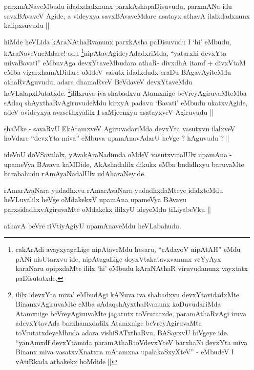 \begin{artha}
parxmANaveMbudu idadxdadxnunx parxkAshapaDisuvudu, parxmANa idu
savxBAvaveV Agide, a videyxya savxBAvaveMdare asatayx athavA
ilalxdadxnunx kalipxsuvudu ||
\end{artha}

\begin{artha}
hiMde heVLida kAraNAthaRvanunx parxkAsha paDisuvudu I `hi' eMbudu,
kAraNaveVneMdare! adu \footnote[1]{cakArAdi avayxyagaLige nipAtaveMdu
  hesaru, ``cAdayoV nipAtAH'' eMdu pANi nisUtarxvu ide, nipAtagaLige
  doyxVtakatavxvanunx veYyAyx karaNaru opipxdaMte ililx `hi' eMbudu
  kAraNAthaR viruvudanunx vayxtatx paDisutatxde,}nipAtavAgideyAdadxriMda,
``yatarxhi devxYta mivaBavati'' eMbuvAga devxYtaveMbudara athaR-
divxdhA itamf + divxVtaM eMba vigarxhamADidare oMdeV vasutx idadxdudx
eraDu BAgavAyiteMdu athaRvAguvudu, adara dhamaRveV BeVdaveV
devxYtaveMdu heVLalapxDutatxde. \footnote[2]{ililx `devxYta miva'
eMbudAgi kANuva iva shabadxvu devxYtavidadxMte BinanxvAgiruvaMte eMba
sAdaqshAyxthaRvanunx koDuvudariMda Atamxnige beVreyAgiruvaMte jagatutx
toVrutatxde, paramAthaRvAgi iruva adevxYtavAda barxhamxdalilx
Atamxnige beVreyAgiruvaMte toVrutatxdeyeMbuda adara vishiSATxthaRvu,
BASayxvU hiVgeye ide. ``yanAmxdf devxYtamida paramAthaRtoV\s devxYteV
barxhaNi devxYta miva Binanx miva vasatxvXnatxra mAtamxna
upalakaSxyXteV'' - eMbudeV I vAtiRkada athakekx hoMdide ||}ililxruva iva shabadxvu
Atamxnige beVreyAgiruvaMteMba sAdaq shAyxthaRvAgiruvudeMdu kirxyA
padavu `Bavati' eMbudu ukatxvAgide, adeV avideyxya avasethxyalilx I
saMjecnxyu asatayxveV Agiruvudu ||
\end{artha}

\begin{artha}
shaMke - savaRvU EkAtamxveV AgiruvadariMda devxYta vasutxvu ilalxveV
hoVdare ``devxYta miva'' eMbuva upamAnavAdarU heVge ? hAguvudu ? ||
\end{artha}


\begin{artha}
ideVnU doVSavalalx, yAvakAraNadimda oMdeV vasutxvinalUlx upamAna -
upameVya BAvavu kaMDide, AkAshadalilx dikukx eMba budidhxyu baruvaMte
barabahudu rAmAyaNadalUlx udAharaNeyide.
\end{artha}

\begin{artha}
rAmarAvaNara yudadhxvu rAmarAvaNara yudadhxdaMteye ididxteMdu
heVLuvalilx heVge oMdakekxV upamAna upameVya BAvavu
parxsidadhxvAgiruvaMte oMdakekx ililxyU ideyeMdu tiLiyabeVku ||

athavA beVre riVtiyAgiyU upamAnaveMdu heVLabahudu.
\end{artha}

